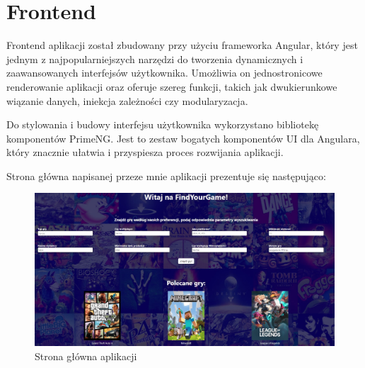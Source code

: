 \section{Frontend}
Frontend aplikacji został zbudowany przy użyciu frameworka Angular, który jest jednym z najpopularniejszych narzędzi do tworzenia dynamicznych i zaawansowanych interfejsów użytkownika. Umożliwia on jednostronicowe renderowanie aplikacji oraz oferuje szereg funkcji, takich jak dwukierunkowe wiązanie danych, iniekcja zależności czy modularyzacja.

Do stylowania i budowy interfejsu użytkownika wykorzystano bibliotekę komponentów PrimeNG. Jest to zestaw bogatych komponentów UI dla Angulara, który znacznie ułatwia i przyspiesza proces rozwijania aplikacji.

Strona główna napisanej przeze mnie aplikacji prezentuje się następująco:

\begin{figure}[h]
    \centering
    \includegraphics[width=1\linewidth]{./img/stronaglowna.jpg}
    \caption{Strona główna aplikacji}
    \label{fig:StronaGlowna}
\end{figure}

